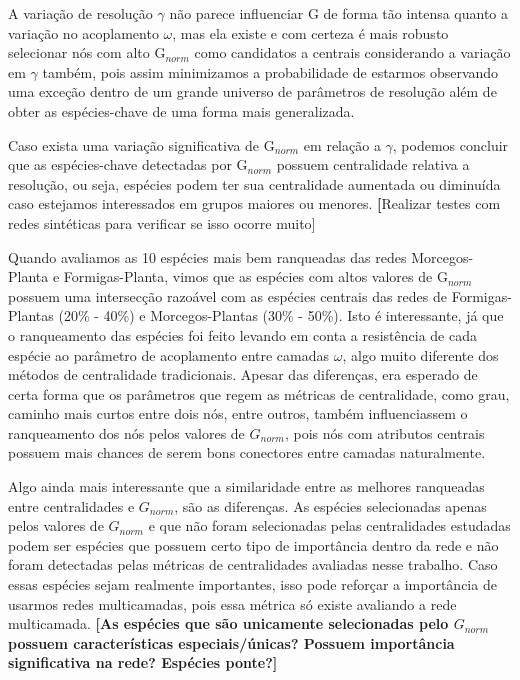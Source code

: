 \documentclass[
  12pt,
]{article}
\begin{document}
A variação de resolução \(\gamma\) não parece influenciar G de forma tão
intensa quanto a variação no acoplamento \(\omega\), mas ela existe e
com certeza é mais robusto selecionar nós com alto G\(_{norm}\) como
candidatos a centrais considerando a variação em \(\gamma\) também, pois
assim minimizamos a probabilidade de estarmos observando uma exceção
dentro de um grande universo de parâmetros de resolução além de obter as
espécies-chave de uma forma mais generalizada.

Caso exista uma variação significativa de G\(_{norm}\) em relação a
\(\gamma\), podemos concluir que as espécies-chave detectadas por
G\(_{norm}\) possuem centralidade relativa a resolução, ou seja,
espécies podem ter sua centralidade aumentada ou diminuída caso
estejamos interessados em grupos maiores ou menores. \textbf[Realizar
testes com redes sintéticas para verificar se isso ocorre muito{]}

Quando avaliamos as 10 espécies mais bem ranqueadas das redes
Morcegos-Planta e Formigas-Planta, vimos que as espécies com altos
valores de G\(_{norm}\) possuem uma intersecção razoável com as espécies
centrais das redes de Formigas-Plantas (20\% - 40\%) e Morcegos-Plantas
(30\% - 50\%). Isto é interessante, já que o ranqueamento das espécies
foi feito levando em conta a resistência de cada espécie ao parâmetro de
acoplamento entre camadas \(\omega\), algo muito diferente dos métodos
de centralidade tradicionais. Apesar das diferenças, era esperado de
certa forma que os parâmetros que regem as métricas de centralidade,
como grau, caminho mais curtos entre dois nós, entre outros, também
influenciassem o ranqueamento dos nós pelos valores de \(G_{norm}\),
pois nós com atributos centrais possuem mais chances de serem bons
conectores entre camadas naturalmente.

Algo ainda mais interessante que a similaridade entre as melhores
ranqueadas entre centralidades e \(G_{norm}\), são as diferenças. As
espécies selecionadas apenas pelos valores de \(G_{norm}\) e que não
foram selecionadas pelas centralidades estudadas podem ser espécies que
possuem certo tipo de importância dentro da rede e não foram detectadas
pelas métricas de centralidades avaliadas nesse trabalho. Caso essas
espécies sejam realmente importantes, isso pode reforçar a importância
de usarmos redes multicamadas, pois essa métrica só existe avaliando a
rede multicamada.
\textbf{[As espécies que são unicamente selecionadas pelo $G_{norm}$ possuem características especiais/únicas? Possuem importância significativa na rede? Espécies ponte?]}
~
\end{document}
